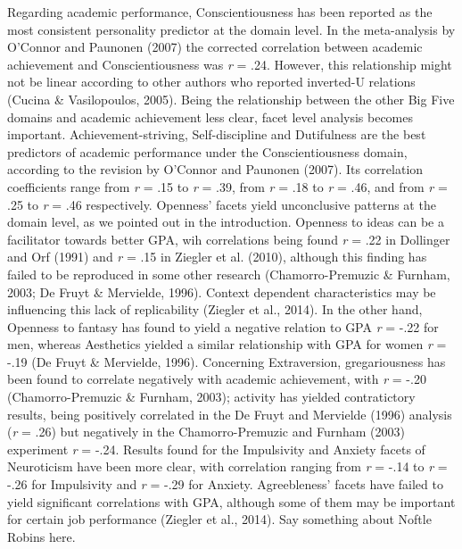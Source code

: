 \documentclass[,man,floatsintext]{apa6}
\theoremstyle{definition}
\theoremstyle{definition}
\theoremstyle{definition}
\theoremstyle{remark}
\begin{document}
Regarding academic performance, Conscientiousness has been reported as
the most consistent personality predictor at the domain level. In the
meta-analysis by O'Connor and Paunonen (2007) the corrected correlation
between academic achievement and Conscientiousness was \emph{r} = .24.
However, this relationship might not be linear according to other
authors who reported inverted-U relations (Cucina \& Vasilopoulos,
2005). Being the relationship between the other Big Five domains and
academic achievement less clear, facet level analysis becomes important.
Achievement-striving, Self-discipline and Dutifulness are the best
predictors of academic performance under the Conscientiousness domain,
according to the revision by O'Connor and Paunonen (2007). Its
correlation coefficients range from \emph{r} = .15 to \emph{r} = .39,
from \emph{r} = .18 to \emph{r} = .46, and from \emph{r} = .25 to
\emph{r} = .46 respectively. Openness' facets yield unconclusive
patterns at the domain level, as we pointed out in the introduction.
Openness to ideas can be a facilitator towards better GPA, wih
correlations being found \emph{r} = .22 in Dollinger and Orf (1991) and
\emph{r} = .15 in Ziegler et al. (2010), although this finding has
failed to be reproduced in some other research (Chamorro-Premuzic \&
Furnham, 2003; De Fruyt \& Mervielde, 1996). Context dependent
characteristics may be influencing this lack of replicability (Ziegler
et al., 2014). In the other hand, Openness to fantasy has found to yield
a negative relation to GPA \emph{r} = -.22 for men, whereas Aesthetics
yielded a similar relationship with GPA for women \emph{r} = -.19 (De
Fruyt \& Mervielde, 1996). Concerning Extraversion, gregariousness has
been found to correlate negatively with academic achievement, with
\emph{r} = -.20 (Chamorro-Premuzic \& Furnham, 2003); activity has
yielded contratictory results, being positively correlated in the De
Fruyt and Mervielde (1996) analysis (\emph{r} = .26) but negatively in
the Chamorro-Premuzic and Furnham (2003) experiment \emph{r} = -.24.
Results found for the Impulsivity and Anxiety facets of Neuroticism have
been more clear, with correlation ranging from \emph{r} = -.14 to
\emph{r} = -.26 for Impulsivity and \emph{r} = -.29 for Anxiety.
Agreebleness' facets have failed to yield significant correlations with
GPA, although some of them may be important for certain job performance
(Ziegler et al., 2014). Say something about Noftle Robins here.
\end{document}
